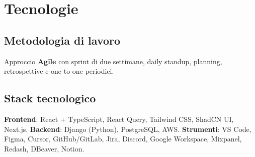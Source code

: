 \chapter{Tecnologie}
\section{Metodologia di lavoro}
Approccio \textbf{Agile} con sprint di due settimane, daily standup, planning, retrospettive e one-to-one periodici.  

\section{Stack tecnologico}
\textbf{Frontend}: React + TypeScript, React Query, Tailwind CSS, ShadCN UI, Next.js.  
\textbf{Backend}: Django (Python), PostgreSQL, AWS.  
\textbf{Strumenti}: VS Code, Figma, Cursor, GitHub/GitLab, Jira, Discord, Google Workspace, Mixpanel, Redash, DBeaver, Notion.